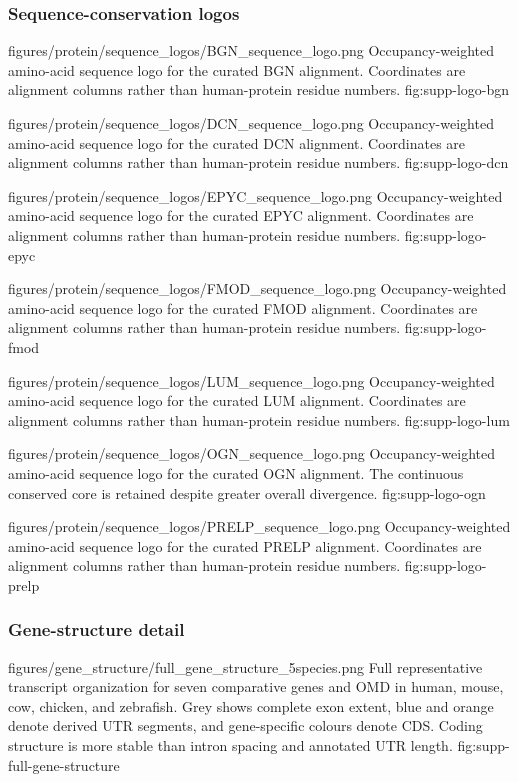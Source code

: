 \clearpage
\subsubsection{Sequence-conservation logos}

\thesissuppfigure
{figures/protein/sequence_logos/BGN_sequence_logo.png}
{Occupancy-weighted amino-acid sequence logo for the curated BGN alignment.
Coordinates are alignment columns rather than human-protein residue numbers.}
{fig:supp-logo-bgn}

\thesissuppfigure
{figures/protein/sequence_logos/DCN_sequence_logo.png}
{Occupancy-weighted amino-acid sequence logo for the curated DCN alignment.
Coordinates are alignment columns rather than human-protein residue numbers.}
{fig:supp-logo-dcn}

\thesissuppfigure
{figures/protein/sequence_logos/EPYC_sequence_logo.png}
{Occupancy-weighted amino-acid sequence logo for the curated EPYC alignment.
Coordinates are alignment columns rather than human-protein residue numbers.}
{fig:supp-logo-epyc}

\thesissuppfigure
{figures/protein/sequence_logos/FMOD_sequence_logo.png}
{Occupancy-weighted amino-acid sequence logo for the curated FMOD alignment.
Coordinates are alignment columns rather than human-protein residue numbers.}
{fig:supp-logo-fmod}

\thesissuppfigure
{figures/protein/sequence_logos/LUM_sequence_logo.png}
{Occupancy-weighted amino-acid sequence logo for the curated LUM alignment.
Coordinates are alignment columns rather than human-protein residue numbers.}
{fig:supp-logo-lum}

\thesissuppfigure
{figures/protein/sequence_logos/OGN_sequence_logo.png}
{Occupancy-weighted amino-acid sequence logo for the curated OGN alignment.
The continuous conserved core is retained despite greater overall divergence.}
{fig:supp-logo-ogn}

\thesissuppfigure
{figures/protein/sequence_logos/PRELP_sequence_logo.png}
{Occupancy-weighted amino-acid sequence logo for the curated PRELP alignment.
Coordinates are alignment columns rather than human-protein residue numbers.}
{fig:supp-logo-prelp}

\clearpage
\subsubsection{Gene-structure detail}

\thesissuppfigure
{figures/gene_structure/full_gene_structure_5species.png}
{Full representative transcript organization for seven comparative genes and
OMD in human, mouse, cow, chicken, and zebrafish. Grey shows complete exon
extent, blue and orange denote derived UTR segments, and gene-specific colours
denote CDS. Coding structure is more stable than intron spacing and annotated
UTR length.}
{fig:supp-full-gene-structure}

